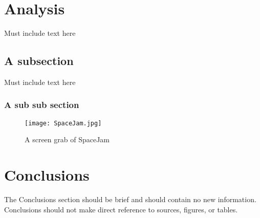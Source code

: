 \documentclass[12pt]{article}
\begin{document}
\newpage
\section{Analysis} 


Must include text here
\subsection{A subsection}
Must include text here
\subsubsection{A sub sub section}

\begin{figure}[h!]
  \texttt{[image: SpaceJam.jpg]}
  \caption{A screen grab of SpaceJam}
\end{figure}





\newpage
\section{Conclusions}


The Conclusions section should be brief and should contain no new information. Conclusions should not make direct reference to sources, figures, or tables. \cite{damn}
\end{document}
